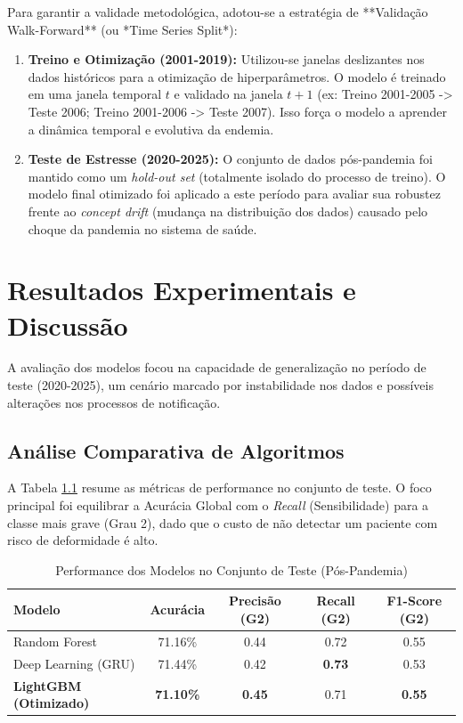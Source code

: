 \documentclass[12pt, a4paper]{report}
\begin{document}
Para garantir a validade metodológica, adotou-se a estratégia de **Validação Walk-Forward** (ou *Time Series Split*):
\begin{enumerate}
    \item \textbf{Treino e Otimização (2001-2019):} Utilizou-se janelas deslizantes nos dados históricos para a otimização de hiperparâmetros. O modelo é treinado em uma janela temporal $t$ e validado na janela $t+1$ (ex: Treino 2001-2005 -> Teste 2006; Treino 2001-2006 -> Teste 2007). Isso força o modelo a aprender a dinâmica temporal e evolutiva da endemia.
    \item \textbf{Teste de Estresse (2020-2025):} O conjunto de dados pós-pandemia foi mantido como um \textit{hold-out set} (totalmente isolado do processo de treino). O modelo final otimizado foi aplicado a este período para avaliar sua robustez frente ao \textit{concept drift} (mudança na distribuição dos dados) causado pelo choque da pandemia no sistema de saúde.
\end{enumerate}

\chapter{Resultados Experimentais e Discussão}



A avaliação dos modelos focou na capacidade de generalização no período de teste (2020-2025), um cenário marcado por instabilidade nos dados e possíveis alterações nos processos de notificação.

\section{Análise Comparativa de Algoritmos}
A Tabela \ref{tab:resultados} resume as métricas de performance no conjunto de teste. O foco principal foi equilibrar a Acurácia Global com o \textit{Recall} (Sensibilidade) para a classe mais grave (Grau 2), dado que o custo de não detectar um paciente com risco de deformidade é alto.

\begin{table}[H]
\centering
\caption{Performance dos Modelos no Conjunto de Teste (Pós-Pandemia)}
\label{tab:resultados}
\begin{tabular}{lcccc}
\toprule
\textbf{Modelo} & \textbf{Acurácia} & \textbf{Precisão (G2)} & \textbf{Recall (G2)} & \textbf{F1-Score (G2)} \\
\midrule
Random Forest & 71.16\% & 0.44 & 0.72 & 0.55 \\
Deep Learning (GRU) & 71.44\% & 0.42 & \textbf{0.73} & 0.53 \\
\textbf{LightGBM (Otimizado)} & \textbf{71.10\%} & \textbf{0.45} & 0.71 & \textbf{0.55} \\
\bottomrule
\end{tabular}
\end{table}
\end{document}
